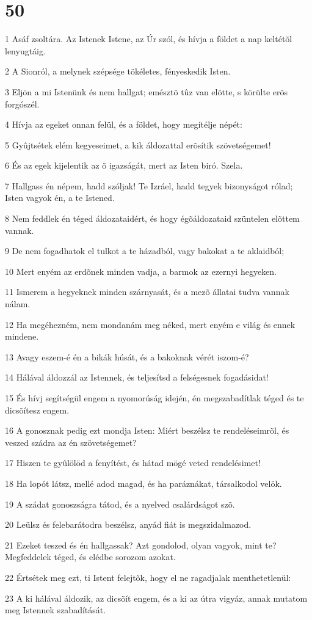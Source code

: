 \chapter{50}

\par 1 Asáf zsoltára. Az Istenek Istene, az Úr szól, és hívja a földet a nap keltétõl lenyugtáig.
\par 2 A Sionról, a melynek szépsége tökéletes, fényeskedik Isten.
\par 3 Eljön a mi Istenünk és nem hallgat; emésztõ tûz van elõtte, s körülte erõs forgószél.
\par 4 Hívja az egeket onnan felül, és a földet, hogy megítélje népét:
\par 5 Gyûjtsétek elém kegyeseimet, a kik áldozattal erõsítik szövetségemet!
\par 6 És az egek kijelentik az õ igazságát, mert az Isten biró. Szela.
\par 7 Hallgass én népem, hadd szóljak! Te Izráel, hadd tegyek bizonyságot rólad; Isten vagyok én, a te Istened.
\par 8 Nem feddlek én téged áldozataidért, és hogy égõáldozataid szüntelen elõttem vannak.
\par 9 De nem fogadhatok el tulkot a te házadból, vagy bakokat a te aklaidból;
\par 10 Mert enyém az erdõnek minden vadja, a barmok az ezernyi hegyeken.
\par 11 Ismerem a hegyeknek minden szárnyasát, és a mezõ állatai tudva vannak nálam.
\par 12 Ha megéhezném, nem mondanám meg néked, mert enyém e világ és ennek mindene.
\par 13 Avagy eszem-é én a bikák húsát, és a bakoknak vérét iszom-é?
\par 14 Hálával áldozzál az Istennek, és teljesítsd a felségesnek fogadásidat!
\par 15 És hívj segítségül engem a nyomorúság idején, én megszabadítlak téged és te dicsõítesz engem.
\par 16 A gonosznak pedig ezt mondja Isten: Miért beszélsz te rendeléseimrõl, és veszed szádra az én szövetségemet?
\par 17 Hiszen te gyûlölöd a fenyítést, és hátad mögé veted rendelésimet!
\par 18 Ha lopót látsz, mellé adod magad, és ha paráznákat, társalkodol velök.
\par 19 A szádat gonoszságra tátod, és a nyelved csalárdságot szõ.
\par 20 Leülsz és felebarátodra beszélsz, anyád fiát is megszidalmazod.
\par 21 Ezeket teszed és én hallgassak? Azt gondolod, olyan vagyok, mint te? Megfeddelek téged, és elédbe sorozom azokat.
\par 22 Értsétek meg ezt, ti Istent felejtõk, hogy el ne ragadjalak menthetetlenül:
\par 23 A ki hálával áldozik, az dicsõít engem, és a ki az útra vigyáz, annak mutatom meg Istennek szabadítását.

